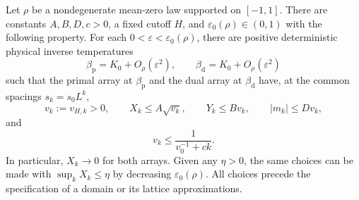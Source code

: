 \begin{proposition}
\label{prop:two-trajectories}
Let \(\rho\) be a nondegenerate mean-zero law supported on \([-1,1]\).
There are constants \(A,B,D,c>0\), a fixed cutoff \(H\), and
\(\varepsilon_0(\rho)\in(0,1)\) with the following property.  For each
\(0<\varepsilon<\varepsilon_0(\rho)\), there are positive deterministic physical
inverse temperatures
\begin{equation}
 \beta_{\mathrm p}=K_0+O_\rho(\varepsilon^2),
 \qquad \beta_{\mathrm d}=K_0+O_\rho(\varepsilon^2)
 \label{eq:tuned-temperatures}
\end{equation}
such that the primal array at \(\beta_{\mathrm p}\) and the dual array
at \(\beta_{\mathrm d}\) have, at the common spacings \(s_k=s_0L^k\),
\begin{equation}
 v_k:=v_{H,k}>0,\qquad
 X_k\le A\sqrt{v_k},\qquad Y_k\le Bv_k,\qquad |m_k|\le Dv_k,
 \label{eq:trajectory-region}
\end{equation}
and
\begin{equation}
 v_k\le\frac1{v_0^{-1}+ck}.
 \label{eq:trajectory-decay}
\end{equation}
In particular, \(X_k\to0\) for both arrays.  Given any \(\eta>0\),
the same choices can be made with \(\sup_k X_k\le\eta\) by decreasing
\(\varepsilon_0(\rho)\).  All choices precede the specification of a
domain or its lattice approximations.
\end{proposition}


